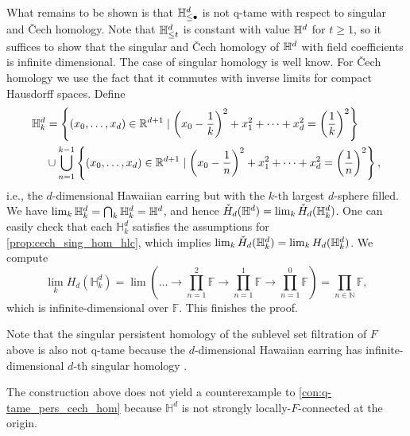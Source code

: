 What remains to be shown is that $\mathbb{H}^d_{\leq \bullet}$ is not q-tame with respect to singular and \v{C}ech homology.
Note that $\mathbb{H}^d_{\leq t}$ is constant with value $\mathbb{H}^d$ for $t \geq 1$, so it suffices to show that the singular and \v{C}ech homology of $\mathbb{H}^d$ with field coefficients is infinite dimensional.
The case of singular homology is well know.
For \v{C}ech homology we use the fact that it commutes with inverse limits for compact Hausdorff spaces.
Define 
\begin{align*}
\mathbb{H}^d_k &= \left\{(x_0,\dots,x_d)\in\mathbb{R}^{d+1}\mid \left(x_0-\frac{1}{k}\right)^2+x_1^2+\dots+x_d^2=\left(\frac{1}{k}\right)^2\right\}\\
&\cup\bigcup_{n=1}^{k-1}\left\{(x_0,\dots,x_d)\in\mathbb{R}^{d+1}\mid \left(x_0-\frac{1}{n}\right)^2+x_1^2+\dots+x_d^2=\left(\frac{1}{n}\right)^2\right\},
\end{align*}
i.e., the $d$-dimensional Hawaiian earring but with the $k$-th largest $d$-sphere filled.
We have $\lim_{k}\mathbb{H}^d_{k} = \bigcap_{k}\mathbb{H}^{d}_{k}=\mathbb{H}^{d}$, and hence $\check{H}_{d}(\mathbb{H}^d) = \lim_{k}\check{H}_{d}(\mathbb{H}^{d}_{k})$.
One can easily check that each $\mathbb{H}^{d}_{k}$ satisfies the assumptions for \cref{prop:cech_sing_hom_hlc}, which implies $\lim_{k}\check{H}_{d}(\mathbb{H}^{d}_{k})=\lim_{k}H_{d}(\mathbb{H}^{d}_{k})$.
We compute
\[
\lim_{k}H_{d}(\mathbb{H}^{d}_{k})=\lim\left(\dots\to \prod_{n=1}^2\mathbb{F}\to \prod_{n=1}^1\mathbb{F}\to \prod_{n=1}^0\mathbb{F}\right)=\prod_{n\in\mathbb{N}}\mathbb{F},
\]
which is infinite-dimensional over $\mathbb{F}$.
This finishes the proof.

\begin{rem}
Note that the singular persistent homology of the sublevel set filtration of $F$ above is also not q-tame because the $d$-dimensional Hawaiian earring has infinite-dimensional $d$-th singular homology \cite{Barratt.1962}. 
\end{rem}

\begin{rem}
The construction above does not yield a counterexample to \cref{con:q-tame_pers_cech_hom} because $\mathbb{H}^{d}$ is not strongly locally-$F$-connected at the origin.
\end{rem}